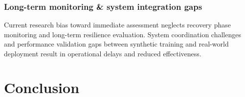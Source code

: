 \documentclass[conference,a4paper]{IEEEtran}
\begin{document}
\subsubsection{Long-term monitoring \& system integration gaps}
Current research bias toward immediate assessment neglects recovery phase monitoring and long-term resilience evaluation. System coordination challenges and performance validation gaps between synthetic training and real-world deployment result in operational delays and reduced effectiveness.


\section{Conclusion}




  
\end{document}
